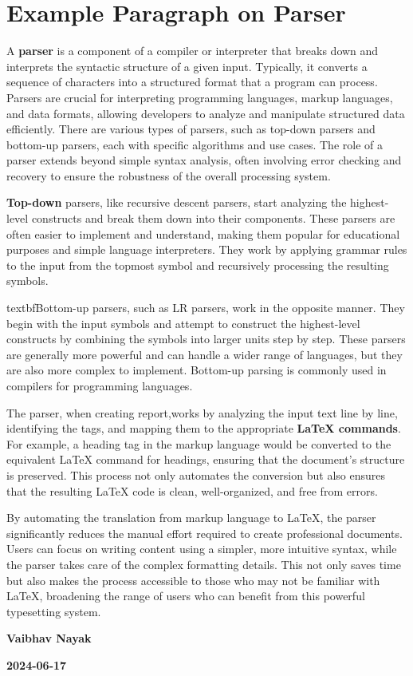 \documentclass[oneside]{book}
\begin{document}
\section{Example Paragraph on Parser}
A \textbf{parser} is a component of a compiler or interpreter that breaks down and interprets the syntactic structure of a given input. Typically, it converts a sequence
        of characters into a structured format that a program can process. Parsers are crucial for interpreting programming languages, markup languages, and data formats,
        allowing developers to analyze and manipulate structured data efficiently. There are various types of parsers, such as top-down parsers and bottom-up parsers,
        each with specific algorithms and use cases. The role of a parser extends beyond simple syntax analysis, often involving error checking and recovery to ensure the 
        robustness of the overall processing system.\par
\textbf{Top-down} parsers, like recursive descent parsers, start analyzing the highest-level constructs and break them down into their components. These parsers are often
        easier to implement and understand, making them popular for educational purposes and simple language interpreters. They work by applying grammar rules to the input
        from the topmost symbol and recursively processing the resulting symbols.\par
textbf{Bottom-up} parsers, such as LR parsers, work in the opposite manner. They begin with the input symbols and attempt to construct the highest-level constructs by
        combining the symbols into larger units step by step. These parsers are generally more powerful and can handle a wider range of languages, but they are also more
        complex to implement. Bottom-up parsing is commonly used in compilers for programming languages.\par
The parser, when creating report,works by analyzing the input text line by line, identifying the tags, and mapping them to the appropriate \textbf{LaTeX commands}.
        For example, a heading tag in the markup language would be converted to the equivalent LaTeX command for headings, ensuring that the document's structure is preserved. This process not only
        automates the conversion but also ensures that the resulting LaTeX code is clean, well-organized, and free from errors.\par
By automating the translation from markup language to LaTeX, the parser significantly reduces the manual effort required to create professional documents.
         Users can focus on writing content using a simpler, more intuitive syntax, while the parser takes care of the complex formatting details.
          This not only saves time but also makes the process accessible to those who may not be familiar with LaTeX, broadening the range of users who can benefit from this powerful typesetting system.\par
\hfill \textbf{Vaibhav Nayak}\par
\hfill \textbf{2024-06-17}\par
\end{document}
